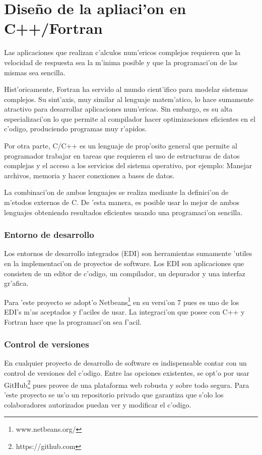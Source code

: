 \section{Dise\~no de la apliaci'on en C++/Fortran}
  Las aplicaciones que realizan c'alculos num'ericos complejos requieren que la velocidad de respuesta sea la m'inima posible y que
  la programaci'on de las mismas sea sencilla.

  Hist'oricamente, Fortran ha servido al mundo cient'ifico para modelar sistemas complejos. Su sint'axis, 
  muy similar al lenguaje matem'atico, lo hace sumamente atractivo para desarrollar aplicaciones num'ericas. Sin embargo,
  es su alta especializaci'on lo que permite al compilador hacer optimizaciones eficientes en el c'odigo, produciendo
  programas muy r'apidos.

  Por otra parte, C/C++ es un lenguaje de prop'osito general que permite al programador trabajar en tareas que requieren
  el uso de estructuras de datos complejas y el acceso a los servicios del sistema operativo, por ejemplo: Manejar archivos, memoria y hacer 
  conexiones a bases de datos.

  La combinaci'on de ambos lenguajes se realiza mediante la definici'on de m'etodos externos de C. De 'esta manera, es posible
  usar lo mejor de ambos lenguajes obteniendo resultados eficientes usando una programaci'on sencilla.

  \subsubsection{Entorno de desarrollo}
  Los entornos de desarrollo integrados (EDI) son herramientas sumamente 'utiles en la implementaci'on de proyectos de software.
  Los EDI son aplicaciones que consisten de un editor de c'odigo, un compilador, un depurador y una interfaz gr'afica.

  Para 'este proyecto se adopt'o Netbeans\footnote{www.netbeans.org/}
  en su versi'on 7 pues es uno de los EDI's m'as aceptados y f'aciles
  de usar. La integraci'on que posee con C++ y Fortran hace que la programaci'on sea f'acil.

  \subsubsection*{Control de versiones}
  En cualquier proyecto de desarrollo de software es indispensable contar con un control de versiones del c'odigo.
  Entre las opciones existentes, se opt'o por usar GitHub\footnote{https://github.com} pues provee de una plataforma web robusta y sobre todo segura. 
  Para 'este proyecto se us'o un repositorio privado que garantiza que s'olo los colaboradores autorizados puedan ver y modificar el c'odigo.

